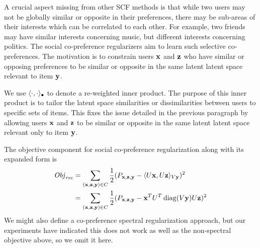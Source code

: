 A crucial aspect missing from other SCF methods is that while two
users may not be globally similar or opposite in their preferences,
there may be sub-areas of their interests which can be correlated to
each other.  For example, two friends may have similar interests
concerning music, but different interests concerning politics.  The
social co-preference regularizers aim to learn such selective
co-preferences. The motivation is to constrain users $\mathbf{x}$ and $\mathbf{z}$ who
have similar or opposing preferences to be similar or opposite in the
same latent latent space relevant to item $\mathbf{y}$.

We use $\langle \cdot, \cdot \rangle_{\bullet}$ to denote a re-weighted inner
product. The purpose of this inner product is to tailor the latent
space similarities or dissimilarities between users to specific sets
of items. This fixes the issue detailed in the previous paragraph by
allowing users $\mathbf{x}$ and $\mathbf{z}$ to be similar or opposite in the same
latent latent space relevant only to item $\mathbf{y}$.

The objective component for social co-preference regularization along
with its expanded form is
\begin{align}
\mathit{Obj}_{\mathit{rsc}} & = \sum_{(\mathbf{x},\mathbf{z},\mathbf{y}) \in C} \frac{1}{2} (P_{\mathbf{x},\mathbf{z},\mathbf{y}} - \langle U\mathbf{x}, U\mathbf{z} \rangle_{V\mathbf{y}})^2 \\
& = \sum_{(\mathbf{x},\mathbf{z},\mathbf{y}) \in C} \frac{1}{2} (P_{\mathbf{x},\mathbf{z},\mathbf{y}} - \mathbf{x}^T U^T \operatorname{diag}(V\mathbf{y}) U \mathbf{z})^2 \nonumber
\end{align}
We might also define a co-preference spectral regularization approach,
but our experiments have indicated this does not work as well as the
non-spectral objective above, so we omit it here.

\begin{comment}
\subsubsection{Social Co-preference Spectral Regularization ($\Obj_\rscs$)}
This is the same as the social co-preference regularization above, except that it uses the spectral regularizer format for 
learning the co-preferences.

 We use $\| \cdot \|_{2,\bullet}$ to denote a re-weighted $L_2$ norm. The reweighing of this norm servers the same purpose as the re-weighted inner product in Section~\ref{sec:rsc}, it tailors the similarities or dissimilarities between users to specific sets of items. This allows users $\x$
and $\z$ to be similar or opposite in the same latent latent space
relevant only to item $\y$.  
 
 The objective component for
 social co-preference spectral regularization along with its expanded form is
 
\begin{align}
\Obj_\rscs & = \sum_{(\x,\z,\y) \in C} \frac{1}{2} P_{\x,\z,\y} \| U\x - U\z \|_{2,V\y}^2 \\
& = \sum_{(\x,\z,\y) \in C} \frac{1}{2} P_{\x,\z,\y} (\x - \z)^T U^T \diag(V\y) U (\x - \z) \nonumber 
\end{align}
\end{comment}